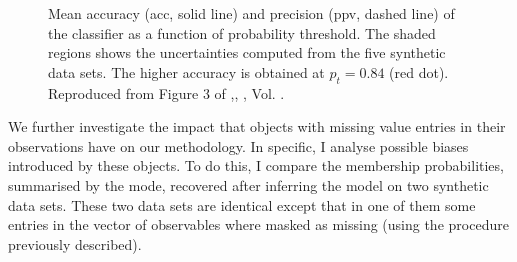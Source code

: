 \begin{figure}[ht!]
\begin{center}
\caption{Mean accuracy (\gls{acc}, solid line) and precision (\gls{ppv}, dashed line) of the classifier as a function of probability threshold. The shaded regions shows the uncertainties computed from the five synthetic data sets. The higher accuracy is obtained at $p_t=0.84$ (red dot). Reproduced from Figure 3 of \citet{Olivares2017},\textit{}, , Vol. .}
\label{fig:ACC}
\end{center}
\end{figure}

We further investigate the impact that objects with missing value entries in their observations have on our methodology. In specific, I analyse possible biases introduced by these objects. To do this, I compare the membership probabilities, summarised by the mode, recovered after inferring the model on two synthetic data sets. These two data sets are identical except that in one of them some entries in the vector of observables where masked as missing (using the procedure previously described).

